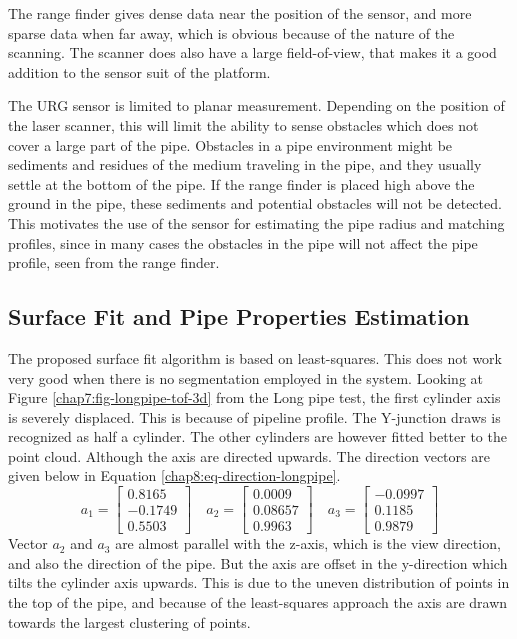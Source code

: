 The range finder gives dense data near the position of the sensor, and more sparse data
when far away, which is obvious because of the nature of the scanning. The scanner does
also have a large field-of-view, that makes it a good addition to the sensor suit of the
platform. 

The URG sensor is limited to planar measurement. Depending on the position of the laser
scanner, this will limit the ability to sense obstacles which does not cover a large part 
of the pipe. Obstacles in a pipe environment might be sediments and residues of the medium
traveling in the pipe, and they usually settle at the bottom of the pipe. If the range
finder is placed high above the ground in the pipe, these sediments and potential
obstacles will not be detected. This motivates the use of the sensor for estimating the
pipe radius and matching profiles, since in many cases the obstacles in the pipe will not
affect the pipe profile, seen from the range finder. 


\subsection{Surface Fit and Pipe Properties Estimation}
The proposed surface fit algorithm is based on least-squares. This does not work very good
when there is no segmentation employed in the system. Looking at Figure
\ref{chap7:fig-longpipe-tof-3d} from the Long pipe test, the first cylinder axis is severely displaced. This
is because of pipeline profile. The Y-junction draws is recognized as half a cylinder. The
other cylinders are however fitted better to the point cloud. Although the axis are
directed upwards. The direction vectors are given below in Equation
\eqref{chap8:eq-direction-longpipe}. 
\begin{equation}
    \label{chap8:eq-direction-longpipe}
    a_1 = \left[ \begin{matrix}
                        0.8165\\
                       -0.1749\\
                       0.5503 
                 \end{matrix} \right] \quad a_2 = \left [
                 \begin{matrix}
                       0.0009\\
                       0.08657\\
                       0.9963
                 \end{matrix} \right] \quad a_3 = \left [
                 \begin{matrix}
                       -0.0997\\
                       0.1185\\
                       0.9879
                 \end{matrix} \right]
\end{equation}
Vector $a_2$ and $a_3$ are almost parallel with the z-axis, which is the view direction,
and also the direction of the pipe. But the axis are offset in the y-direction which tilts
the cylinder axis upwards. This is due to the uneven distribution of points in the top of
the pipe, and because of the least-squares approach the axis are drawn towards the largest
clustering of points. 

